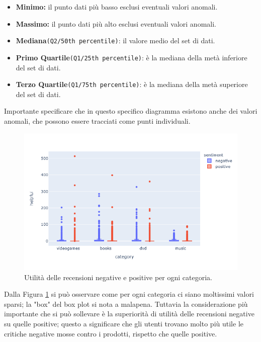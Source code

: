 			\begin{itemize}
				\item \textbf{Minimo:} il punto dati più basso esclusi eventuali valori anomali.
				\item \textbf{Massimo:} il punto dati più alto esclusi eventuali valori anomali.
				\item \textbf{Mediana}\verb|(Q2/50th percentile)|: il valore medio del set di dati.
				\item \textbf{Primo Quartile}\verb|(Q1/25th percentile)|: è la mediana della metà inferiore del set di dati.
				\item \textbf{Terzo Quartile}\verb|(Q1/75th percentile)|: è la mediana della metà superiore del set di dati.
			\end{itemize} 
		
			Importante specificare che in questo specifico diagramma esistono anche dei valori anomali, che possono essere tracciati come punti individuali. \\
				
			\begin{figure}
				\includegraphics[width=\textwidth]{Figure/boxplot-ratingVShelpful}	
				\caption{Utilità delle recensioni negative e positive per ogni categoria.}
				\label{fig:boxplot-ratingVShelpful}
			\end{figure}
			
			Dalla Figura \ref{fig:boxplot-ratingVShelpful} si può osservare come per ogni categoria ci siano moltissimi valori sparsi; la "box" del box plot si nota a malapena. Tuttavia la considerazione più importante che si può sollevare è la superiorità di utilità delle recensioni negative su quelle positive; questo a significare che gli utenti trovano molto più utile le critiche negative mosse contro i prodotti, rispetto che quelle positive.
			

				
		
		
